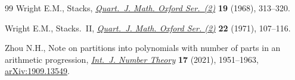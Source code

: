 \begin{thebibliography}{99}
Wright E.M., Stacks, \href{https://doi.org/10.1093/qmath/19.1.313}{\textit{Quart.~J. Math. Oxford Ser.~(2)}} \textbf{19}
 (1968), 313--320.

Wright E.M., Stacks.~{II}, \href{https://doi.org/10.1093/qmath/22.1.107}{\textit{Quart.~J. Math. Oxford Ser. (2)}} \textbf{22}
 (1971), 107--116.

Zhou N.H., Note on partitions into polynomials with number of parts in an
 arithmetic progression, \href{https://doi.org/10.1142/S1793042121500718}{\textit{Int.~J. Number Theory}} \textbf{17} (2021),
 1951--1963, \href{https://arxiv.org/abs/1909.13549}{arXiv:1909.13549}.

\end{thebibliography}
